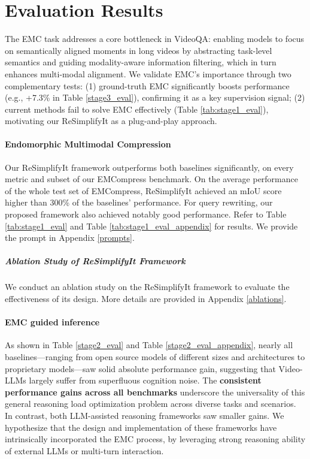 \section{Evaluation Results}


The EMC task addresses a core bottleneck in VideoQA: enabling models to focus on semantically aligned moments in long videos by abstracting task-level semantics and guiding modality-aware information filtering, which in turn enhances multi-modal alignment. We validate EMC's importance through two complementary tests: (1) ground-truth EMC significantly boosts performance (e.g., +7.3\% in Table \ref{stage3_eval}), confirming it as a key supervision signal; (2) current methods fail to solve EMC effectively (Table \ref{tab:stage1_eval}), motivating our ReSimplifyIt as a plug-and-play approach.

\paragraph{Endomorphic Multimodal Compression} Our ReSimplifyIt framework outperforms both baselines significantly, on every metric and subset of our EMCompress benchmark. On the average performance of the whole test set of EMCompress, ReSimplifyIt achieved an mIoU score higher than 300\% of the baselines' performance. For query rewriting, our proposed framework also achieved notably good performance. Refer to Table \ref{tab:stage1_eval} and Table \ref{tab:stage1_eval_appendix} for results. We provide the prompt in Appendix \ref{prompts}.


\subparagraph{Ablation Study of ReSimplifyIt Framework}
We conduct an ablation study on the ReSimplifyIt framework to evaluate the effectiveness of its design. More details are provided in Appendix \ref{ablations}.



\paragraph{EMC guided inference}
As shown in Table \ref{stage2_eval} and Table \ref{stage2_eval_appendix}, nearly all baselines---ranging from open source models of different sizes and architectures to proprietary models---saw solid absolute performance gain, suggesting that Video-LLMs largely suffer from superfluous cognition noise. The \textbf{consistent performance gains across all benchmarks} underscore the universality of this general reasoning load optimization problem across diverse tasks and scenarios. In contrast, both LLM-assisted reasoning frameworks saw smaller gains. We hypothesize that the design and implementation of these frameworks have intrinsically incorporated the EMC process, by leveraging strong reasoning ability of external LLMs or multi-turn interaction.

